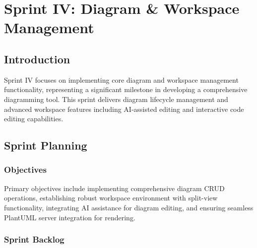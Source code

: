 \chapter[Sprint IV]{Sprint IV: Diagram \& Workspace Management}

\section{Introduction}
Sprint IV focuses on implementing core diagram and workspace management functionality, representing a significant milestone in developing a comprehensive diagramming tool. This sprint delivers diagram lifecycle management and advanced workspace features including AI-assisted editing and interactive code editing capabilities.

\section{Sprint Planning}

\subsection{Objectives}
Primary objectives include implementing comprehensive diagram CRUD operations, establishing robust workspace environment with split-view functionality, integrating AI assistance for diagram editing, and ensuring seamless PlantUML server integration for rendering.

\subsection{Sprint Backlog}

